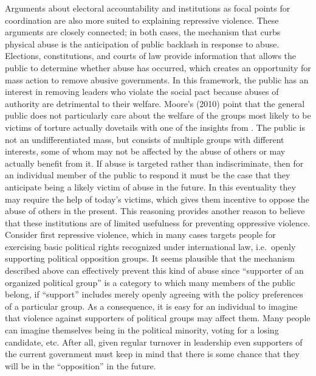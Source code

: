 \documentclass[11pt]{article}
\begin{document}
Arguments about electoral accountability and institutions as focal points for coordination are also more suited to explaining repressive violence. These arguments are closely connected; in both cases, the mechanism that curbs physical abuse is the anticipation of public backlash in response to abuse. Elections, constitutions, and courts of law provide information that allows the public to determine whether abuse has occurred, which creates an opportunity for mass action to remove abusive governments. In this framework, the public has an interest in removing leaders who violate the social pact because abuses of authority are detrimental to their welfare. Moore's (2010) point that the general public does not particularly care about the welfare of the groups most likely to be victims of torture actually dovetails with one of the insights from \citet{Weingast1997}. The public is not an undifferentiated mass, but consists of multiple groups with different interests, some of whom may not be affected by the abuse of others or may actually benefit from it. If abuse is targeted rather than indiscriminate, then for an individual member of the public to respond it must be the case that they anticipate being a likely victim of abuse in the future. In this eventuality they may require the help of today's victims, which gives them incentive to oppose the abuse of others in the present. This reasoning provides another reason to believe that these institutions are of limited usefulness for preventing oppressive violence. Consider first repressive violence, which in many cases targets people for exercising basic political rights recognized under international law, i.e.\ openly supporting political opposition groups. It seems plausible that the mechanism described above can effectively prevent this kind of abuse since ``supporter of an organized political group'' is a category to which many members of the public belong, if ``support'' includes merely openly agreeing with the policy preferences of a particular group. As a consequence, it is easy for an individual to imagine that violence against supporters of political groups may affect them. Many people can imagine themselves being in the political minority, voting for a losing candidate, etc. After all, given regular turnover in leadership even supporters of the current government must keep in mind that there is some chance that they will be in the ``opposition'' in the future. 
\end{document}
